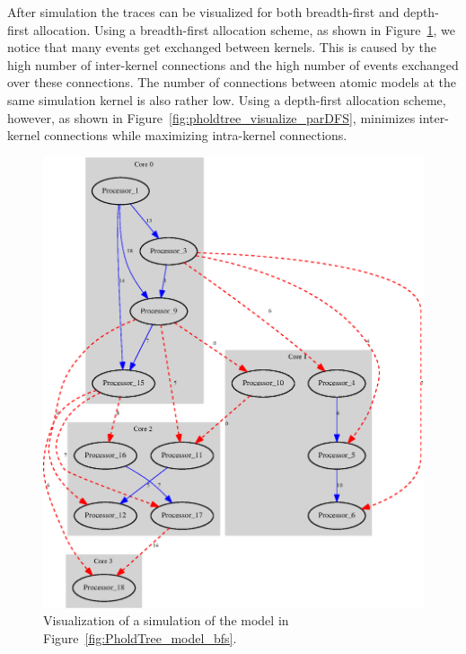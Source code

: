 After simulation the traces can be visualized for both breadth-first and depth-first allocation.
Using a breadth-first allocation scheme, as shown in Figure~\ref{fig:pholdtree_visualize_parBFS}, we notice that many events get exchanged between kernels.
This is caused by the high number of inter-kernel connections and the high number of events exchanged over these connections.
The number of connections between atomic models at the same simulation kernel is also rather low.
Using a depth-first allocation scheme, however, as shown in Figure~\ref{fig:pholdtree_visualize_parDFS}, minimizes inter-kernel connections while maximizing intra-kernel connections.

\begin{figure}
    \center
    \includegraphics[width=\columnwidth]{fig/pholdtreed1n3t5000c4BFS.eps}
    \caption{Visualization of a simulation of the model in Figure~\ref{fig:PholdTree_model_bfs}.}
    \label{fig:pholdtree_visualize_parBFS}
\end{figure}

